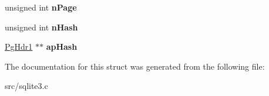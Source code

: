 \begin{DoxyCompactItemize}
\item 
\hypertarget{struct_p_cache1_ace332c276e28352992529f60f0ac457c}{unsigned int {\bfseries n\-Page}}\label{struct_p_cache1_ace332c276e28352992529f60f0ac457c}

\item 
\hypertarget{struct_p_cache1_a09d9488a8a3a52822e33dd43e14c69e1}{unsigned int {\bfseries n\-Hash}}\label{struct_p_cache1_a09d9488a8a3a52822e33dd43e14c69e1}

\item 
\hypertarget{struct_p_cache1_a1169ec7ba2a628d89841d16ced651e1f}{\hyperlink{struct_pg_hdr1}{Pg\-Hdr1} $\ast$$\ast$ {\bfseries ap\-Hash}}\label{struct_p_cache1_a1169ec7ba2a628d89841d16ced651e1f}

\end{DoxyCompactItemize}


The documentation for this struct was generated from the following file\-:\begin{DoxyCompactItemize}
\item 
src/sqlite3.\-c\end{DoxyCompactItemize}
